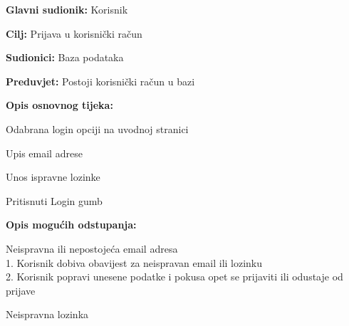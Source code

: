 					\noindent {}
					\begin{packed_item}
						\item \textbf{Glavni sudionik:} Korisnik
						\item \textbf{Cilj:} Prijava u korisnički račun
						\item \textbf{Sudionici:} Baza podataka
						\item \textbf{Preduvjet:} Postoji korisnički račun u bazi
						\item \textbf{Opis osnovnog tijeka:}
						\begin{packed_enum}
							\item Odabrana login opciji na uvodnoj stranici
							\item Upis email adrese
							\item Unos ispravne lozinke
							\item Pritisnuti Login gumb
						\end{packed_enum}
						\item \textbf{Opis mogućih odstupanja:}
						\begin{packed_item}
							\item[2.a] Neispravna ili nepostojeća email adresa
							\\1. Korisnik dobiva obavijest za neispravan email ili lozinku
							\\2. Korisnik popravi unesene podatke i pokusa opet se prijaviti ili odustaje od prijave
							\item[3.a] Neispravna lozinka
						\end{packed_item}
					\end{packed_item}
					
